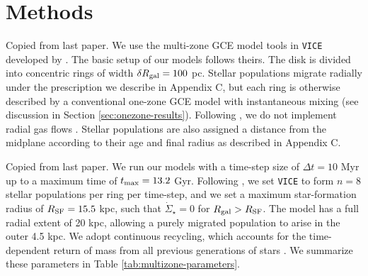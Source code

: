 \documentclass[twocolumn,twocolappendix,linenumbers]{aastex631}
\newcommand{\vice}{{\tt VICE}\xspace}
\newcommand{\todo}[1]{{\color{red}#1}}
\begin{document}
\citet{spitoni_remind_2024}

\section{Methods}
\label{sec:methods}

\todo{Copied from last paper.} We use the multi-zone GCE model tools in \vice developed by \citet{johnson_stellar_2021}. The basic setup of our models follows theirs. The disk is divided into concentric rings of width $\delta R_{\rm gal}=100$ pc. Stellar populations migrate radially under the prescription we describe in Appendix C, but each ring is otherwise described by a conventional one-zone GCE model with instantaneous mixing (see discussion in Section \ref{sec:onezone-results}). Following \citet{johnson_stellar_2021}, we do not implement radial gas flows \citep[e.g.,][]{LaceyFall1985-RadialGasFlows,BilitewskiSchonrich2012-RadialFlows}. Stellar populations are also assigned a distance from the midplane according to their age and final radius as described in Appendix C.

\todo{Copied from last paper.} We run our models with a time-step size of $\Delta t=10$ Myr up to a maximum time of $t_{\rm max}=13.2$ Gyr. Following \citet{johnson_stellar_2021}, we set \vice to form $n=8$ stellar populations per ring per time-step, and we set a maximum star-formation radius of $R_{\rm SF} = 15.5$ kpc, such that $\dot\Sigma_\star=0$ for $R_{\rm gal}>R_{\rm SF}$. The model has a full radial extent of 20 kpc, allowing a purely migrated population to arise in the outer 4.5 kpc. We adopt continuous recycling, which accounts for the time-dependent return of mass from all previous generations of stars \citep[see Equation 2 from][]{JohnsonWeinberg2020-Starbursts}. We summarize these parameters in Table \ref{tab:multizone-parameters}.
\end{document}
